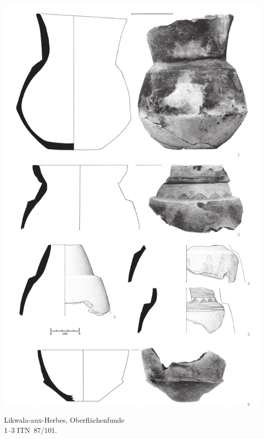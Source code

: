 \begin{pl}[H]
	\includegraphics{plt/Taf96.pdf}
	\vspace{.75em}\caption{Likwala-aux-Herbes, Oberflächenfunde \\ 1--3 ITN~87/101.}
	\label{pl:96}
\end{pl}

